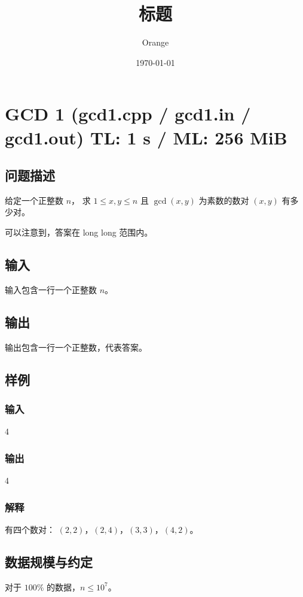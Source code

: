 \documentclass[UTF8]{article}
\title{标题}
\author{Orange}
\date{\today}
\begin{document}
	\heiti

	\section{GCD 1 \small(gcd1.cpp / gcd1.in / gcd1.out) TL: 1 s / ML: 256 MiB}
	\subsection{问题描述}
	给定一个正整数 $n$，
	求 $1 \le x, y \le n$ 且 $\gcd(x, y)$ 为素数的数对 $(x, y)$ 有多少对。

	可以注意到，答案在 long long 范围内。

	\subsection{输入}
	输入包含一行一个正整数 $n$。

	\subsection{输出}
	输出包含一行一个正整数，代表答案。

	\subsection{样例}
	\subsubsection{输入}
	4

	\subsubsection{输出}
	4

	\subsubsection{解释}
	有四个数对：
	$(2, 2)$，$(2, 4)$，$(3, 3)$，$(4,2)$。

	\subsection{数据规模与约定}
	对于 $100\%$ 的数据，$n \le 10^7$。
\end{document}
